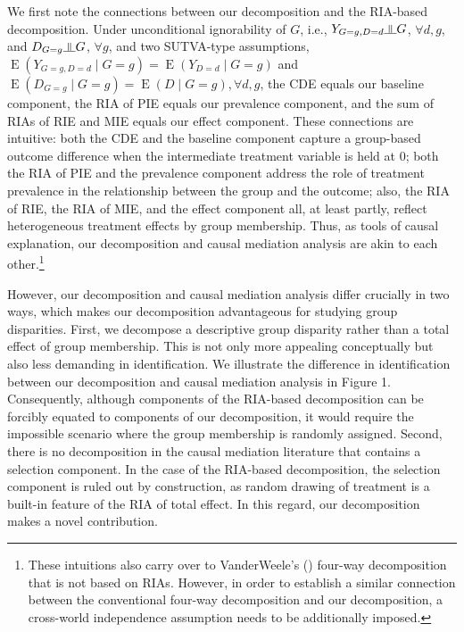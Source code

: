\documentclass[12pt,a4paper]{article}
\newcommand{\indep}{\rotatebox[origin=c]{90}{$\models$}}  %
\newcommand{\E}{\operatorname{E}}
\begin{document}
We first note the connections between our decomposition and the RIA-based decomposition. 
Under unconditional ignorability of $G$, i.e., $Y_{G=g,D=d} \indep G$, $\forall d,g$, and $D_{G=g} \indep G$, $\forall g$, and two SUTVA-type assumptions, $\E(Y_{G=g,D=d} \mid  G=g)=\E(Y_{D=d} \mid  G=g)$ and $\E(D_{G=g} \mid  G=g)=\E(D \mid  G=g), \forall d,g$, the CDE equals our baseline component, the RIA of PIE equals our prevalence component, and the sum of RIAs of RIE and MIE equals our effect component. These connections are intuitive: both the CDE and the baseline component capture a group-based outcome difference when the intermediate treatment variable is held at $0$; both the RIA of PIE and the prevalence component address the role of treatment prevalence in the relationship between the group and the outcome; also, the RIA of RIE, the RIA of MIE, and the effect component all, at least partly, reflect heterogeneous treatment effects by group membership. Thus, as tools of causal explanation, our decomposition and causal mediation analysis are akin to each other.\footnote{These intuitions also carry over to VanderWeele's (\citeyear{vanderweele_unification_2014}) four-way decomposition that is not based on RIAs. However, in order to establish a similar connection between the conventional four-way decomposition and our decomposition, a cross-world independence assumption needs to be additionally imposed.}

However, our decomposition and causal mediation analysis differ crucially in two ways, which makes our decomposition advantageous for studying group disparities. First, we decompose a descriptive group disparity rather than a total effect of group membership. This is not only more appealing conceptually but also less demanding in identification. We illustrate the difference in identification between our decomposition and causal mediation analysis in Figure 1. Consequently, although components of the RIA-based decomposition can be forcibly equated to  components of our decomposition, it would require the impossible scenario where the group membership is randomly assigned.
Second, there is no decomposition in the causal mediation literature that contains a selection component. In the case of the RIA-based decomposition, the selection component is ruled out by construction, as random drawing of treatment is a built-in feature of the RIA of total effect. In this regard, our decomposition makes a novel contribution.
\end{document}
